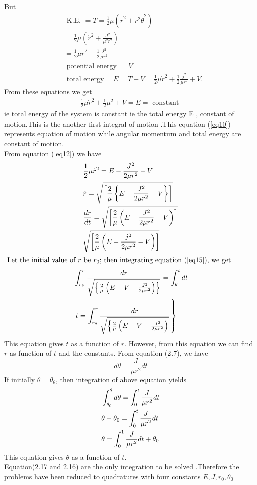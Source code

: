 But
\begin{align*}
&\text { K.E. }=T=\frac{1}{2} \mu\left(\dot{r}^{2}+r^{2} \dot{\theta}^{2}\right) \\
&=\frac{1}{2} \mu\left(\dot{r}^{2}+\frac{J^{2}}{\mu^{2} r^{2}}\right) \\
&=\frac{1}{2} \mu \dot{r}^{2}+\frac{1}{2} \frac{J^{2}}{\mu r^{2}} \\
&\text { potential energy } =V\\
&\text { total energy } \quad E
=T+V=\frac{1}{2} \mu \dot{r}^{2}+\frac{1}{2} \frac{j^{2}}{\mu r^{2}}+V .
\end{align*}
From these equations we get 
\begin{align}
\frac{1}{2} \mu \dot{r}^{2}+\frac{1}{2} \mu^{2}+V=E=\text { constant } \label{eq12}
\end{align}
ie total energy of the system is constant ie the total energy E , constant of motion.This is the another first integral of motion .This equation (\ref{eq10}) represents equation of motion while angular momentum and total energy are constant of motion.\\
From equation (\ref{eq12}) we have
\begin{align}
	&\frac{1}{2} \mu \dot{r}^{2}=E-\frac{J^{2}}{2 \mu r^{2}}-V \notag\\
	&\dot{r}=\sqrt{\left[\frac{2}{\mu}\left\{E-\frac{J^{2}}{2 \mu r^{2}}-V\right\}\right]} \notag\\
	&\frac{d r}{d t}=\sqrt{\left[\frac{2}{\mu}\left(E-\frac{J^{2}}{2 \mu r^{2}}-V\right)\right]} \notag\\
	&\sqrt{\left[\frac{2}{\mu}\left(E-\frac{j^{2}}{2 \mu r^{2}}-V\right)\right]} \label{eq15}
\end{align}
$\text { Let the initial value of } r \text { be } r_{0} \text {; then integrating equation (\ref{eq15}), we get }$
\begin{align}
	&\int_{r_{\theta}}^{r} \frac{d r}{\sqrt{\left\{\frac{2}{\mu}\left(E-V-\frac{J^{2}}{2 \mu r^{2}}\right)\right\}}}=\int_{\theta}^{t} d t \notag \\
	&\left.t=\int_{r_{\theta}}^{r} \frac{d r}{\sqrt{\left\{\frac{2}{\mu}\left(E-V-\frac{J^{2}}{2 \mu r^{2}}\right)\right.}}\right\} \label{eq16}
\end{align}
This equation gives $t$ as a function of $r$. However, from this equation we can find $r$ as function of $t$ and the constants.
From equation (2.7), we have
$$
d \theta=\frac{J}{\mu r^{2}} d t
$$
If initially $\theta=\theta_{\theta}$, then integration of above equation yields
\begin{align}
&\int_{\theta_{0}}^{\theta} d \theta=\int_{0}^{t} \frac{J}{\mu r^{2}} d t \notag \\
&\theta-\theta_{0}=\int_{0}^{t} \frac{J}{\mu r^{2}} d t \notag \\
&\theta=\int_{0}^{1} \frac{J}{\mu r^{2}} d t+\theta_{0}
\end{align}
This equation gives $\theta$ as a function of $t$.\\
Equation(2.17 and 2.16) are the only integration to be solved .Therefore the problems have been reduced to quadratures with four constants $E,J,r_0,\theta_0$
